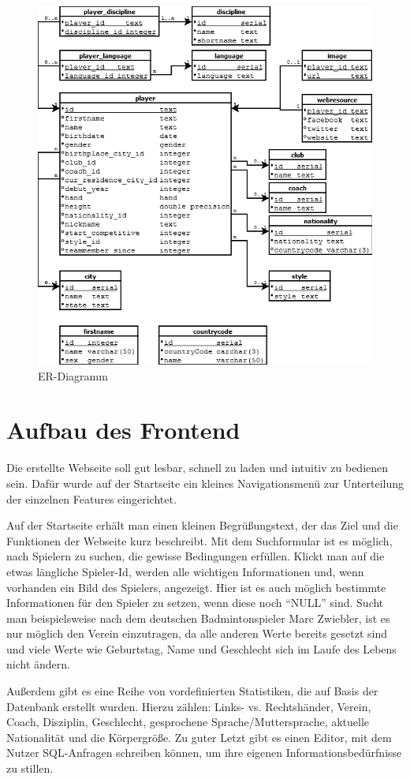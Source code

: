 \begin{figure}[H]
\centering
\includegraphics[width=1\textwidth]{images/ER-Diagramm} 
\caption{ER-Diagramm}
\label{fig:ER-Diagramm}
\end{figure}

\section{Aufbau des Frontend}
\label{Frontend}
Die erstellte Webseite soll gut lesbar, schnell zu laden und intuitiv zu bedienen sein. Dafür wurde auf der Startseite ein kleines Navigationsmenü zur Unterteilung der einzelnen Features eingerichtet. 

Auf der Startseite erhält man einen kleinen Begrüßungstext, der das Ziel und die Funktionen der Webseite kurz beschreibt. Mit dem Suchformular ist es möglich, nach Spielern zu suchen, die gewisse Bedingungen erfüllen. Klickt man auf die etwas längliche Spieler-Id, werden alle wichtigen Informationen und, wenn vorhanden ein Bild des Spielers, angezeigt. Hier ist es auch möglich bestimmte Informationen für den Spieler zu setzen, wenn diese noch "`NULL"' sind. Sucht man beispielsweise nach dem deutschen Badmintonspieler Marc Zwiebler, ist es nur möglich den Verein einzutragen, da alle anderen Werte bereits gesetzt sind und viele Werte wie Geburtstag, Name und Geschlecht sich im Laufe des Lebens nicht ändern.

Außerdem gibt es eine Reihe von vordefinierten Statistiken, die auf Basis der Datenbank erstellt wurden. Hierzu zählen:
Links- vs. Rechtshänder, Verein, Coach, Disziplin, Geschlecht, gesprochene Sprache/Muttersprache, aktuelle Nationalität und die Körpergröße. Zu guter Letzt gibt es einen Editor, mit dem Nutzer SQL-Anfragen schreiben können, um ihre eigenen Informationsbedürfnisse zu stillen.